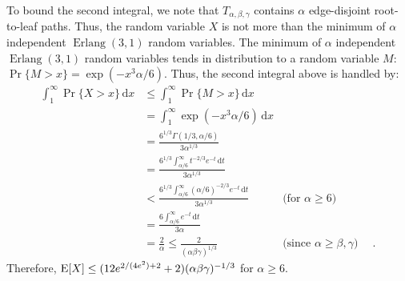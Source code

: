 \documentclass{patmorin}
\DeclareMathOperator{\erlang}{Erlang}
\begin{document}
To bound the second integral, we note that $T_{\alpha,\beta,\gamma}$
contains $\alpha$ edge-disjoint root-to-leaf paths.  Thus, the random
variable $X$ is not more than the minimum of $\alpha$ independent
$\erlang(3,1)$ random variables.  The minimum of $\alpha$ independent
$\erlang(3,1)$ random variables tends in distribution to a random variable
$M$: $\Pr\{M>x\} = \exp(-x^3\alpha/6)$.  Thus, the second integral above is handled by:
\begin{align*}
   \int_1^{\infty} \Pr\{X > x\}\,\mathrm{d}x 
         & \le \int_1^{\infty} \Pr\{M > x\}\,\mathrm{d}x \\
         & =  \int_1^{\infty} \exp(-x^3\alpha/6)\,\mathrm{d}x \\
         & = \frac{6^{1/3}\Gamma(1/3,\alpha/6)}{3\alpha^{1/3}} \\
         & = \frac{6^{1/3}\int_{\alpha/6}^\infty t^{-2/3}e^{-t}\,\mathrm{d}t}{3\alpha^{1/3}} \\
         & < \frac{6^{1/3}\int_{\alpha/6}^\infty (\alpha/6)^{-2/3}e^{-t}\,\mathrm{d}t}{3\alpha^{1/3}} & \text{(for $\alpha \ge 6$)} \\
         & = \frac{6\int_{\alpha/6}^\infty e^{-t}\,\mathrm{d}t}{3\alpha} \\
         & = \frac{2}{\alpha} 
         \le \frac{2}{(\alpha\beta\gamma)^{1/3}} &\text{(since $\alpha \ge \beta,\gamma$}) & \enspace .
\end{align*}
Therefore, $\mathrm{E}[X] \le (12e^{2/(4e^2)+2}+2)(\alpha\beta\gamma)^{-1/3}$ for $\alpha \ge 6$.




%
\end{document}
